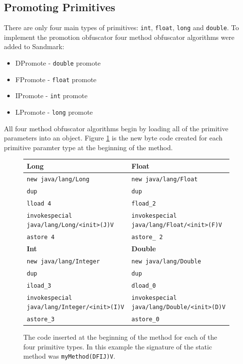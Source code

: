 \subsection{Promoting Primitives}
There are only four main types of primitives: \texttt{int}, 
\texttt{float}, \texttt{long} and \texttt{double}. To implement the
promotion obfuscator four method obfuscator algorithms were added
to Sandmark:
\begin{itemize}
  \item DPromote - \texttt{double} promote
  \item FPromote - \texttt{float} promote
  \item IPromote - \texttt{int} promote
  \item LPromote - \texttt{long} promote
\end{itemize}
All four method obfuscator algorithms begin by loading all of the 
primitive parameters into an object. Figure \ref{params} is the new byte
code created for each primitive paramter type at the beginning of the method.

\begin{figure}[ht]
\begin{tabular}{| l | l |}
\hline
\textbf{Long} & \textbf{Float} \\
\hline
\texttt{new java/lang/Long} & \texttt{new java/lang/Float} \\
\texttt{dup} & \texttt{dup} \\
\texttt{lload 4} & \texttt{fload\_2} \\
\texttt{invokespecial java/lang/Long/<init>(J)V} & \texttt{invokespecial java/lang/Float/<init>(F)V} \\
\texttt{astore 4} & \texttt{astore\_ 2} \\
\hline
\textbf{Int} & \textbf{Double} \\
\hline
\texttt{new java/lang/Integer} & \texttt{new java/lang/Double} \\
\texttt{dup} & \texttt{dup} \\
\texttt{iload\_3} & \texttt{dload\_0} \\
\texttt{invokespecial java/lang/Integer/<init>(I)V} & \texttt{invokespecial java/lang/Double/<init>(D)V} \\
\texttt{astore\_3} & \texttt{astore\_0} \\
\hline
\end{tabular}
\caption{The code inserted at the beginning of the method for each of
the four primitive types. In this example the signature of the static
method was  \texttt{myMethod(DFIJ)V}.}
\label{params}
\end{figure}

